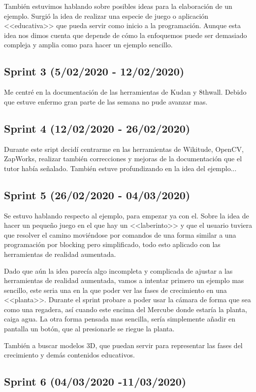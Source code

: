 También estuvimos hablando sobre posibles ideas para la elaboración de un ejemplo. Surgió la idea de realizar una especie de juego o aplicación <<educativa>> que pueda servir como inicio a la programación. Aunque esta idea nos dimos cuenta que depende de cómo la enfoquemos puede ser demasiado compleja y amplia como para hacer un ejemplo sencillo.
\subsection{Sprint 3 (5/02/2020 - 12/02/2020)}

Me centré en la documentación de las herramientas de Kudan y 8thwall.
Debido que estuve enfermo gran parte de las semana no pude avanzar mas.
\subsection{Sprint 4 (12/02/2020 - 26/02/2020)}
Durante este sript decidí centrarme en las herramientas de Wikitude, OpenCV, ZapWorks, realizar también correcciones y mejoras de la documentación que el tutor había señalado.
También estuve profundizando en la idea del ejemplo... 
\subsection{Sprint 5 (26/02/2020 - 04/03/2020)}
Se estuvo hablando respecto al ejemplo, para empezar ya con el. Sobre la idea de hacer un pequeño juego en el que hay un <<laberinto>> y que el usuario tuviera que resolver el camino moviéndose por comandos de una forma similar a una programación por blocking pero simplificado, todo esto aplicado con las herramientas de realidad aumentada. 

Dado que aún la idea parecía algo incompleta y complicada de ajustar a las herramientas de realidad aumentada, vamos a intentar primero un ejemplo mas sencillo, este seria una en la que poder ver las fases de crecimiento en una <<planta>>. 
Durante el sprint probare a poder usar la cámara de forma que sea como una regadera, así cuando este encima del Mercube donde estaría la planta, caiga agua. La otra forma pensada mas sencilla, sería simplemente añadir en pantalla un botón, que al presionarle se riegue la planta.

También a buscar modelos 3D, que puedan servir para representar las fases del crecimiento y demás contenidos educativos.

\subsection{Sprint 6 (04/03/2020 -11/03/2020)}


